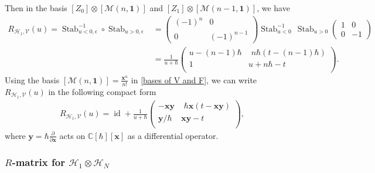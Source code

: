 \documentclass[10pt]{amsart}
\theoremstyle{definition}
\numberwithin{equation}{section}
\newcommand{\bC}{\mathbb{C}}
\newcommand{\cM}{\mathcal{M}}
\newcommand{\Stab}{\operatorname{Stab}}
\newcommand{\id}{\operatorname{id}}
\begin{document}
Then in the basis $[Z_0]\otimes[\cM(n,\mathbf 1)]$ and $[Z_1]\otimes[\cM(n-1,\mathbf 1)]$, we have 
\begin{align*}
    R_{\mathcal H_1,\mathcal V}(u)=\Stab_{u<0,\epsilon}^{-1}\circ\Stab_{u>0,\epsilon}&=\begin{pmatrix}
(-1)^n & 0 \\
0 & (-1)^{n-1}
\end{pmatrix}
\Stab_{u<0}^{-1}\, \Stab_{u>0}
\begin{pmatrix}
1 & 0 \\
0 & -1
\end{pmatrix}
\\
&=\frac{1}{u+\hbar}\left(
\begin{array}{cc}
 u-(n-1)\hbar & \, \, n\hbar\left(t-(n-1)\hbar\right) \\
 1 & u+n\hbar-t \\
\end{array}
\right).
\end{align*}
Using the basis $[\cM(n,\mathbf 1)]=\frac{\mathbf x^n}{n!}$ in \eqref{bases of V and F}, we can write $R_{\mathcal H_1,\mathcal V}(u)$ in the following compact form
\begin{align}\label{R(H_1,V)}
    R_{\mathcal H_1,\mathcal V}(u)=\id+\frac{1}{u+\hbar}\left(
\begin{array}{cc}
 -\mathbf x\mathbf y &\,\, \hbar\mathbf x (t-\mathbf x\mathbf y) \\
 \mathbf y/\hbar & \mathbf x\mathbf y-t \\
\end{array}
\right),
\end{align}
where $\mathbf y=\hbar\frac{\partial}{\partial\mathbf x}$ acts on $\bC[\hbar][\mathbf x]$ as a differential operator.


\subsubsection{\texorpdfstring{$R$}{R}-matrix for \texorpdfstring{$\mathcal H_1\otimes\mathcal H_N$}{fund(x)Sym}}
\end{document}
